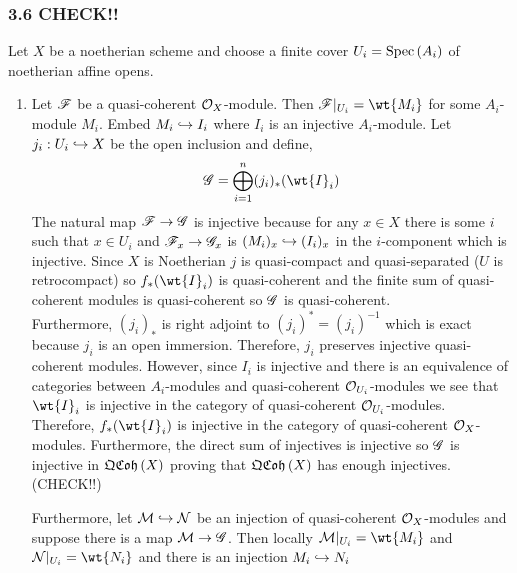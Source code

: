 \documentclass[12pt]{article}
\begin{document}
\subsubsection{3.6 CHECK!!}

Let $X$ be a noetherian scheme and choose a finite cover $U_i = \mathrm{Spec}\left( A_i \right)$ of noetherian affine opens.

\begin{enumerate}
\item Let $\mathscr{F}$ be a quasi-coherent $\mathcal{O}_{X}$-module. Then $\F|_{U_i} = \wt{M_i}$ for some $A_i$-module $M_i$. Embed $M_i \hookrightarrow I_i$ where $I_i$ is an injective $A_i$-module. Let $j_i : U_i \hookrightarrow X$ be the open inclusion and define,
\[ \G = \bigoplus_{i = 1}^n (j_i)_*(\wt{I}_i) \]
The natural map $\mathscr{F} \to \mathscr{G}$ is injective because for any $x \in X$ there is some $i$ such that $x \in U_i$ and $\mathscr{F}_x \to \mathscr{G}_x$ is $(M_i)_x \hookrightarrow (I_i)_x$ in the $i$-component which is injective. Since $X$ is Noetherian $j$ is quasi-compact and quasi-separated ($U$ is retrocompact) so $f_*(\wt{I}_i)$ is quasi-coherent and the finite sum of quasi-coherent modules is quasi-coherent so $\mathscr{G}$ is quasi-coherent. 
\bigskip
\\
Furthermore, $(j_i)_*$ is right adjoint to $(j_i)^* = (j_i)^{-1}$ which is exact because $j_i$ is an open immersion. Therefore, $j_i$ preserves injective quasi-coherent modules. However, since $I_i$ is injective and there is an equivalence of categories between $A_i$-modules and quasi-coherent $\mathcal{O}_{U_i}$-modules we see that $\wt{I}_i$ is injective in the category of quasi-coherent $\mathcal{O}_{U_i}$-modules. Therefore, $f_*(\wt{I}_i)$ is injective in the category of quasi-coherent $\mathcal{O}_{X}$-modules. Furthermore, the direct sum of injectives is injective so $\mathscr{G}$ is injective in $\mathfrak{QCoh}\left(X\right)$ proving that $\mathfrak{QCoh}\left(X\right)$ has enough injectives. (CHECK!!)


Furthermore, let $\mathcal{M} \hookrightarrow \mathcal{N}$ be an injection of quasi-coherent $\mathcal{O}_{X}$-modules and suppose there is a map $\mathcal{M} \to \mathscr{G}$. Then locally $\M|_{U_i} = \wt{M_i}$ and $\sN|_{U_i} = \wt{N_i}$ and there is an injection $M_i \hookrightarrow N_i$ 


\end{enumerate}
\end{document}
